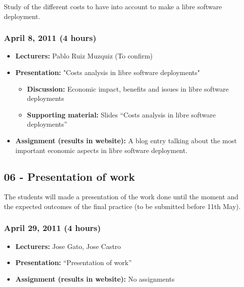 \documentclass[a4paper]{article}
\begin{document}
Study of the different costs to have into account to make a libre software deployment. 

\subsubsection{April 8, 2011 (4 hours)}

\begin{itemize}
\item \textbf{Lecturers:} Pablo Ruiz Muzquiz (To confirm)
\item \textbf{Presentation:} "Costs analysis in libre software deployments"
  \begin{itemize}
  \item \textbf{Discussion:} Economic impact, benefits and issues in libre software deployments
  \item \textbf{Supporting material:} Slides ``Costs analysis in libre software deployments''
  \end{itemize}
\item \textbf{Assignment (results in website):} A blog entry talking about the most important economic aspects in libre software deployment.
\end{itemize}


\subsection{06 - Presentation of work}

The students will made a presentation of the work done until the moment and the expected outcomes of the final practice (to be submitted before 11th May).

\subsubsection{April 29, 2011 (4 hours)}

\begin{itemize}
\item \textbf{Lecturers:} Jose Gato, Jose Castro
\item \textbf{Presentation:} ``Presentation of work''
\item \textbf{Assignment (results in website):} No assignments
\end{itemize}
\end{document}
